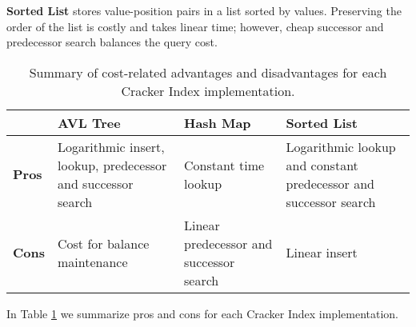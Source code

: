 \textbf{Sorted List} stores value-position pairs in a list sorted by values. Preserving the order of the list is costly and takes linear time; however, cheap successor and predecessor search balances the query cost.

\begin{table}
\begin{tabular}{| m{2em}  | m{2cm} | m{2cm}|  m{2cm} |} 
\hline
 & \textbf{AVL Tree}& \textbf{Hash Map}&\textbf{Sorted List} \\ 
\hline
\textbf{Pros} & Logarithmic insert, lookup, predecessor and successor search & Constant time lookup & Logarithmic lookup and constant predecessor and successor search \\
\hline
\textbf{Cons} & Cost for balance maintenance & Linear predecessor and successor search & Linear insert \\
\hline
\end{tabular}
\caption{Summary of cost-related advantages and disadvantages for each Cracker Index implementation.}
\label{table:implementations}
\end{table}

In Table \ref{table:implementations} we summarize pros and cons for each Cracker Index implementation.
